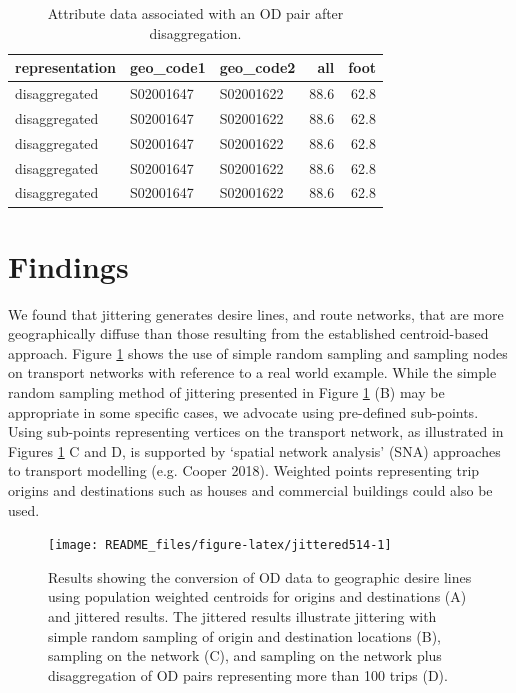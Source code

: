 \documentclass[
]{article}
\begin{document}
\begin{table}

\caption{\label{tab:dis2}Attribute data associated with an OD pair after disaggregation.}
\centering
\begin{tabular}[t]{lllrr}
\toprule
representation & geo\_code1 & geo\_code2 & all & foot\\
\midrule
disaggregated & S02001647 & S02001622 & 88.6 & 62.8\\
disaggregated & S02001647 & S02001622 & 88.6 & 62.8\\
disaggregated & S02001647 & S02001622 & 88.6 & 62.8\\
disaggregated & S02001647 & S02001622 & 88.6 & 62.8\\
disaggregated & S02001647 & S02001622 & 88.6 & 62.8\\
\bottomrule
\end{tabular}
\end{table}

\hypertarget{findings}{%
\section{Findings}\label{findings}}

We found that jittering generates desire lines, and route networks, that are more geographically diffuse than those resulting from the established centroid-based approach.
Figure \ref{fig:jittered514} shows the use of simple random sampling and sampling nodes on transport networks with reference to a real world example.
While the simple random sampling method of jittering presented in Figure \ref{fig:jittered514} (B) may be appropriate in some specific cases, we advocate using pre-defined sub-points.
Using sub-points representing vertices on the transport network, as illustrated in Figures \ref{fig:jittered514} C and D, is supported by `spatial network analysis' (SNA) approaches to transport modelling (e.g. Cooper 2018).
Weighted points representing trip origins and destinations such as houses and commercial buildings could also be used.

\begin{figure}

{\centering \texttt{[image: README\_files/figure-latex/jittered514-1]} 

}

\caption{Results showing the conversion of OD data to geographic desire lines using population weighted centroids for origins and destinations (A) and jittered results. The jittered results illustrate jittering with simple random sampling of origin and destination locations (B), sampling on the network (C), and sampling on the network plus disaggregation of OD pairs representing more than 100 trips (D).}\label{fig:jittered514}
\end{figure}
\end{document}
